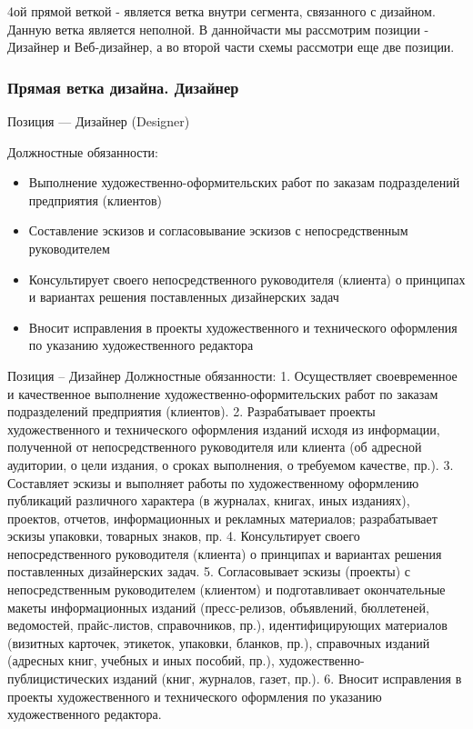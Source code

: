 \documentclass{../industrial-development}
\begin{document}
\lecturenotes
 4ой прямой веткой  - является ветка внутри сегмента, связанного с дизайном. Данную ветка является неполной. В даннойчасти мы рассмотрим позиции - Дизайнер и Веб-дизайнер, а во второй части схемы рассмотри еще две позиции.

\begin{frame} \frametitle{Прямая ветка дизайна. Дизайнер }
 \begin{block}{}
  \alert{Позиция --- Дизайнер (Designer)}

Должностные обязанности: 
  \end{block}
  \begin{itemize}
  \item  Выполнение художественно-оформительских работ по заказам подразделений предприятия (клиентов)
  \item  Составление эскизов и согласовывание эскизов с непосредственным руководителем 
  \item Консультирует своего непосредственного руководителя (клиента) о принципах и вариантах решения поставленных дизайнерских задач
 \item  Вносит исправления в проекты художественного и технического оформления по указанию художественного редактора
  \end{itemize}
\end{frame}

\lecturenotes
Позиция – Дизайнер
Должностные обязанности:
1.	Осуществляет своевременное и качественное выполнение художественно-оформительских работ по заказам подразделений предприятия (клиентов).
2.	Разрабатывает проекты художественного и технического оформления изданий исходя из информации, полученной от непосредственного руководителя или клиента (об адресной аудитории, о цели издания, о сроках выполнения, о требуемом качестве, пр.).
3.	Составляет эскизы и выполняет работы по художественному оформлению публикаций различного характера (в журналах, книгах, иных изданиях), проектов, отчетов, информационных и рекламных материалов; разрабатывает эскизы упаковки, товарных знаков, пр.
4.	Консультирует своего непосредственного руководителя (клиента) о принципах и вариантах решения поставленных дизайнерских задач.
5.	Согласовывает эскизы (проекты) с непосредственным руководителем (клиентом) и подготавливает окончательные макеты информационных изданий (пресс-релизов, объявлений, бюллетеней, ведомостей, прайс-листов, справочников, пр.), идентифицирующих материалов (визитных карточек, этикеток, упаковки, бланков, пр.), справочных изданий (адресных книг, учебных и иных пособий, пр.), художественно-публицистических изданий (книг, журналов, газет, пр.).
6.	Вносит исправления в проекты художественного и технического оформления по указанию художественного редактора.
\end{document}
